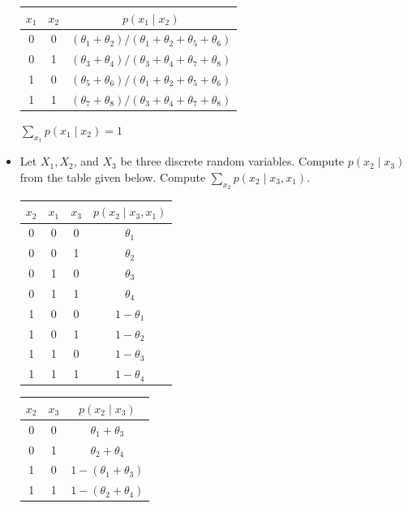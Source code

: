 \documentclass{tufte-handout}
\newcommand{\bmp}[1]{\begin{minipage}{#1}}
\newcommand{\emp}{\end{minipage}}
\newcommand{\tw}{\textwidth}
\begin{document}
\begin{itemize}
  \vspace{0.5cm} 
  \bmp{0.5\tw}
\begin{center}
\small
\begin{tabular}{cc|c}
$x_1$ & $x_2$ & $p(x_1 \mid x_2)$\\
 \hline  0 & 0 & $(\theta_1+\theta_2)/(\theta_1+\theta_2+\theta_5+\theta_6)$\\ 
 0 & 1 & $(\theta_3+\theta_4)/(\theta_3+\theta_4+\theta_7+\theta_8)$ \\  
 1 & 0 & $(\theta_5+\theta_6)/(\theta_1+\theta_2+\theta_5+\theta_6)$\\
 1 & 1 & $(\theta_7+\theta_8)/(\theta_3+\theta_4+\theta_7+\theta_8)$ \\ 
\end{tabular}
\end{center}
\emp
 \bmp{0.5\tw}
\begin{center}
\small
$\sum_{x_1} p(x_1\mid x_2) = 1$
\end{center}
\emp

  \vspace{0.5cm}
  \item   Let $X_1, X_2$, and $X_3$ be three discrete random variables. Compute $p(x_2\mid x_3)$ from the table given below. Compute $\sum_{x_2} p(x_2\mid x_3,x_1)$.
  
   \vspace{0.5cm}
 \bmp{0.5\tw}
\begin{center}
\begin{tabular}{ccc|c}
$x_2$ & $x_1$ & $x_3$ & $ p(x_2\mid x_3,x_1)$\\ \hline  0 & 0 & 0 & $\theta_1$\\ 0 & 0 & 1& $\theta_2$ \\  0 & 1 & 0 & $\theta_3$ \\  0 & 1 & 1 & $\theta_4$ \\ 
 1 & 0 & 0 & $1 - \theta_1$\\1 & 0 & 1& $1- \theta_2$ \\ 1 & 1 & 0 & $1-\theta_3$ \\ 1 & 1 & 1 & $1-\theta_4$ \\ 
\end{tabular}
\end{center}
\emp
 \bmp{0.5\tw}
\begin{center}
\small
\begin{tabular}{cc|c}
$x_2$ & $x_3$ & $p(x_2\mid x_3)$\\
 \hline  0 & 0 & $\theta_1+\theta_3$\\ 
 0 & 1 & $\theta_2+\theta_4$ \\  
 1 & 0 & $1-(\theta_1+\theta_3)$\\
 1 & 1 & $1-(\theta_2+\theta_4)$ \\ 
\end{tabular}
\end{center}
\emp
 

\end{itemize}
\end{document}
